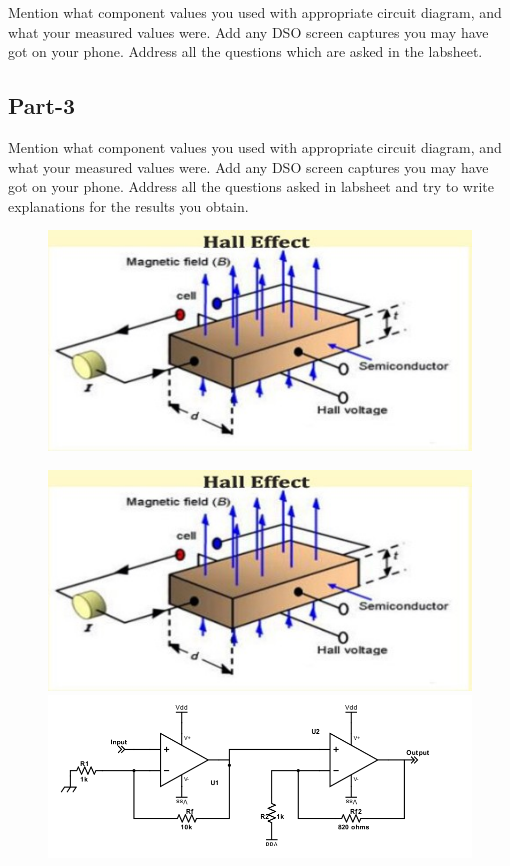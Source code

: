 \documentclass[12pt]{article}
\begin{document}
Mention what component values you used with appropriate circuit diagram, and what your measured values were. Add any DSO screen captures you may have got on your phone. Address all the questions which are asked in the labsheet.\

\subsection{Part-3}

Mention what component values you used with appropriate circuit diagram, and what your measured values were. Add any DSO screen captures you may have got on your phone. Address all the questions asked in labsheet and try to write explanations for the results you obtain.\\

\begin{figure}

\centering
\includegraphics[scale = 0.7]{Hall-Effect1.jpg}
\end{figure}
  
\begin{figure}[h]
\centering

\begin{minipage}{1.0\textwidth}
\centering
\includegraphics[width=0.4\linewidth, height=0.20\textheight]{Hall-Effect1.jpg}
\quad
\includegraphics[width=0.4\linewidth, height=0.20\textheight]{hall_amp.png}
\label{fig:prob1_6_2}
\end{minipage}

\end{figure}
\end{document}
